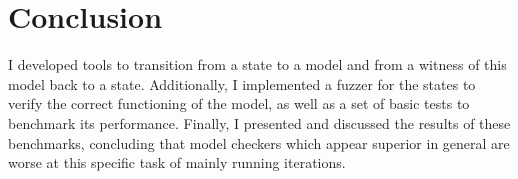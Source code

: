 \chapter{Conclusion}
I developed tools to transition from a state to a model and from a
witness of this model back to a state. Additionally, I implemented a
fuzzer for the states to verify the correct functioning of the model,
as well as a set of basic tests to benchmark its performance.
Finally, I presented and discussed the results of these benchmarks,
concluding that model checkers which appear superior in general are
worse at this specific task of mainly running iterations.

